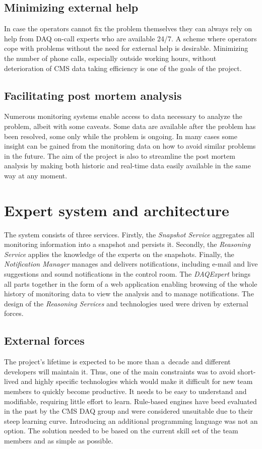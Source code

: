 \documentclass[a4paper]{jpconf}
\begin{document}
\subsection{Minimizing external help}
In case the operators cannot fix the problem themselves they can always rely on help from DAQ on-call experts who are available 24/7. A scheme where operators cope with problems without the need for external help is desirable. Minimizing the number of phone calls, especially outside working hours, without deterioration of CMS data taking efficiency is one of the goals of the project.


\subsection{Facilitating post mortem analysis}
Numerous monitoring systems enable access to data necessary to analyze the problem, albeit with some caveats. Some data are available after the problem has been resolved, some only while the problem is ongoing. In many cases some insight can be gained from the monitoring data on how to avoid similar problems in the future. The aim of the project is also to streamline the post mortem analysis by making both historic and real-time data easily available in the same way at any moment.

\section{Expert system and architecture}

The system consists of three services. Firstly, the {\it Snapshot Service} aggregates all monitoring information into a snapshot and persists it. Secondly, the { \it Reasoning Service} applies the knowledge of the experts on the snapshots. Finally, the { \it Notification Manager } manages and delivers notifications, including e-mail and live suggestions and sound notifications in the control room. The { \it DAQExpert } brings all parts together in the form of a web application enabling browsing of the whole history of monitoring data to view the analysis and to manage notifications. The design of the {\it Reasoning Services} and technologies used were driven by external forces.

\subsection{External forces}
The project's lifetime is expected to be more than a~decade and different developers will maintain it. Thus, one of the main constraints was to avoid short-lived and highly specific technologies which would make it difficult for new team members to quickly become productive. It needs to be easy to understand and modifiable, requiring little effort to learn. Rule-based engines have beed evaluated in the past by the CMS DAQ group and were considered unsuitable due to their steep learning curve. Introducing an additional programming language was not an option. The solution needed to be based on the current skill set of the team members and as simple as possible.
\end{document}
